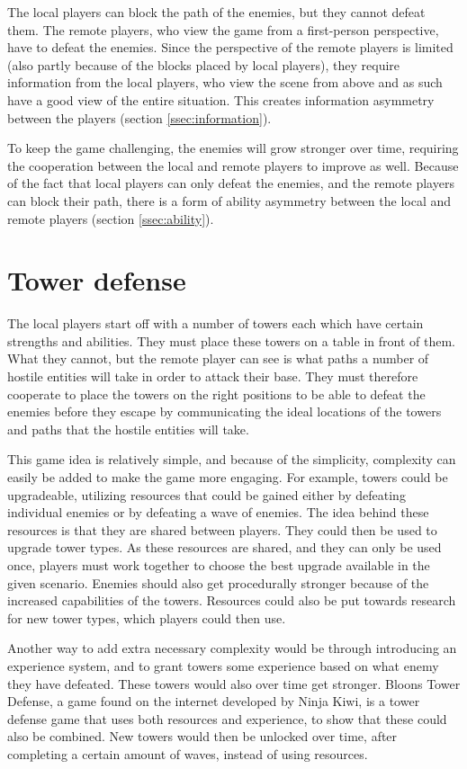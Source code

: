 	The local players can block the path of the enemies, but they cannot defeat
	them. The remote players, who view the game from a first-person perspective,
	have to defeat the enemies. Since the perspective of the remote players is
	limited (also partly because of the blocks placed by local players), they
	require information from the local players, who view the scene from above
	and as such have a good view of the entire situation. This creates
	information asymmetry between the players (section \ref{ssec:information}).

	To keep the game challenging, the enemies will grow stronger over time,
	requiring the cooperation between the local and remote players to improve
	as well. Because of the fact that local players can only defeat the enemies,
	and the remote players can block their path, there is a form of ability
	asymmetry between the local and remote players (section \ref{ssec:ability}).

\section{Tower defense} \label{sec:towerdefense}
	The local players start off with a number of towers each
	which have certain strengths and abilities. They must place
	these towers on a table in front of them. What they cannot,
	but the remote player can see is what paths a number of
	hostile entities will take in order to attack their base.
	They must therefore cooperate to place the towers on the right
	positions to be able to defeat the enemies before they escape
	by communicating the ideal locations of the
	towers and paths that the hostile entities will take.

	This game idea is relatively simple, and because of the simplicity,
	complexity can easily be added to make the game more engaging. For
	example, towers could be upgradeable, utilizing resources that
	could be gained either by defeating individual enemies or by defeating
	a wave of enemies. The idea behind these resources is that they are
	shared between players. They could then be used to upgrade
	tower types. As these resources are shared, and they can only be
	used once, players must work together to choose the best upgrade
	available in the given scenario. Enemies should also get procedurally
	stronger because of the increased capabilities of the towers. Resources
	could also be put towards research for new tower types, which players
	could then use.

	Another way to add extra necessary complexity would be through
	introducing an experience system, and to grant towers some experience based
	on what enemy they have defeated. These towers would also over time get
	stronger. Bloons Tower Defense, a game found on the internet developed by Ninja Kiwi, is a tower defense game that uses both resources and experience, to show that these could also be combined. New towers would then be unlocked over time, after completing a certain amount of waves, instead of using resources.

